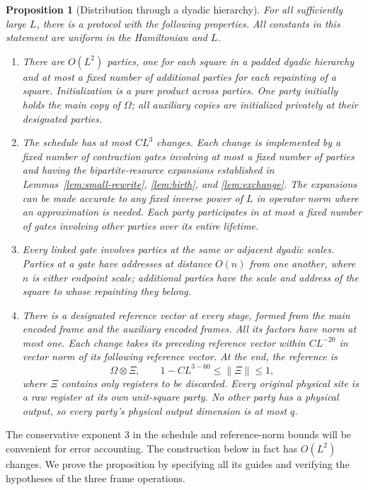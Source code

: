 \documentclass[11pt]{article}
\numberwithin{equation}{section}
\newtheorem{proposition}[theorem]{Proposition}
\theoremstyle{definition}
\theoremstyle{remark}
\newcommand{\norm}[1]{\lVert #1\rVert}
\begin{document}
\begin{proposition}[Distribution through a dyadic hierarchy]
\label{prop:protocol}
For all sufficiently large $L$, there is a protocol with the following
properties.  All constants in this statement are uniform in the
Hamiltonian and $L$.
\begin{enumerate}
\item
There are $O(L^2)$ parties, one for each square in a padded dyadic
hierarchy and at most a fixed number of additional parties for each
repainting of a square.  Initialization is a pure product across
parties.  One party initially holds the main copy of $\Omega$; all
auxiliary copies are initialized privately at their designated parties.
\item
The schedule has at most $C L^3$ changes.  Each change is implemented by
a fixed number of contraction gates involving at most a fixed number of
parties and having the bipartite-resource expansions established in
Lemmas~\ref{lem:small-rewrite}, \ref{lem:birth}, and
\ref{lem:exchange}.  The expansions can be made accurate to any fixed
inverse power of $L$ in operator norm where an approximation is needed.
Each party participates in at most a fixed number of gates involving
other parties over its entire lifetime.
\item
Every linked gate involves parties at the same or adjacent dyadic
scales.  Parties at a gate have addresses at distance $O(n)$ from one
another, where $n$ is either endpoint scale; additional parties have the
scale and address of the square to whose repainting they belong.
\item
There is a designated reference vector at every stage, formed from the
main encoded frame and the auxiliary encoded frames.  All its factors
have norm at most one.  Each change takes its preceding reference vector
within $C L^{-20}$ in vector norm of its following reference vector.
At the end, the reference is
\[
 \Omega\otimes\Xi,
 \qquad 1-C L^{3-60}\le \norm{\Xi}\le1,
\]
where $\Xi$ contains only registers to be discarded.  Every original
physical site is a raw register at its own unit-square party.  No other
party has a physical output, so every party's physical output dimension
is at most $q$.
\end{enumerate}
\end{proposition}

The conservative exponent $3$ in the schedule and reference-norm bounds
will be convenient for error accounting.  The construction below in fact
has $O(L^2)$ changes.  We prove the proposition by specifying all its
guides and verifying the hypotheses of the three frame operations.
\end{document}
